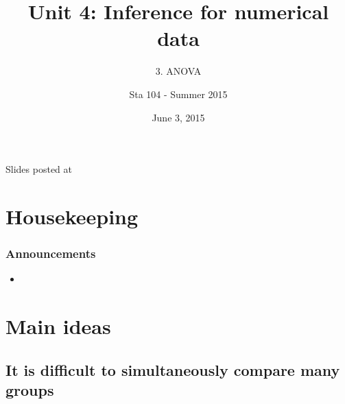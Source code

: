 \documentclass[11pt,containsverbatim,handout,xcolor=xelatex,dvipsnames,table]{beamer}
\title{Unit 4: Inference for numerical data}
\subtitle{3. ANOVA}
\author{Sta 104 - Summer 2015}
\date{June 3, 2015}
\institute{Duke University, Department of Statistical Science}
\begin{document}



\begin{frame}[plain]

\titlepage
\vfill
{\scriptsize {} \hfill Slides posted at  \webLink{\CourseSite}{\CourseSite}}
\addtocounter{framenumber}{-1} 

\end{frame}


\section{Housekeeping}


\begin{frame}
\frametitle{Announcements}

\begin{itemize}

\item 

\end{itemize}

\end{frame}


\section{Main ideas}


\subsection{It is difficult to simultaneously compare many groups}
\label{mi1}

\end{document}
